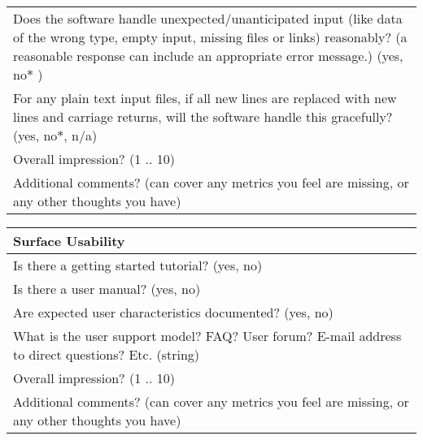 \begin{table}[H]
\begin{tabular}{p{14cm}}
\hline
Does the software handle unexpected/unanticipated input (like data of the wrong type, empty input, missing files or links) reasonably? (a reasonable response can include an appropriate error message.) ({yes, no$\ast$ })\\
For any plain text input files, if all new lines are replaced with new lines and carriage returns, will the software handle this gracefully? ({yes, no$\ast$, n/a})\\
Overall impression? ({1 .. 10})\\
Additional comments? (can cover any metrics you feel are missing, or any other thoughts you have)\\
\hline
\end{tabular}
\end{table}

\begin{table}[H]
\centering
\begin{tabular}{p{14cm}}
\hline
\textbf{Surface Usability}\\
\hline
Is there a getting started tutorial? ({yes, no})\\
Is there a user manual? ({yes, no})\\
Are expected user characteristics documented? ({yes, no})\\
What is the user support model? FAQ? User forum? E-mail address to direct questions? Etc. (string)\\
Overall impression? ({1 .. 10})\\
Additional comments? (can cover any metrics you feel are missing, or any other thoughts you have)\\


\end{tabular}
\end{table}
